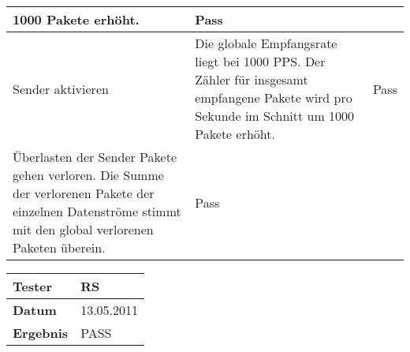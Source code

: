 \begin{table}[h]
\begin{center}
\begin{tabular}{|p{2.5cm}|p{7.55cm}|p{5cm}|}
                    1000 Pakete erhöht. & Pass\\
                \hline
                    Sender aktivieren & Die globale Empfangsrate liegt bei 1000 PPS. Der Zähler für
                    insgesamt empfangene Pakete wird pro Sekunde im Schnitt um
                    1000 Pakete erhöht. & Pass\\
                \hline
                    Überlasten der Sender Pakete gehen verloren. Die Summe der verlorenen Pakete der einzelnen
                    Datenströme stimmt mit den global verlorenen Paketen
                    überein. & Pass\\
                \hline
            \end{tabular}
            \begin{tabular}{|p{3.5cm}|p{11cm}|}
                \textbf{Tester} & RS\\
                \hline
                \textbf{Datum} & 13.05.2011\\
                \hline
                \textbf{Ergebnis} & PASS\\
                \hline
            \end{tabular}
        \end{center}
    \end{table}
    

